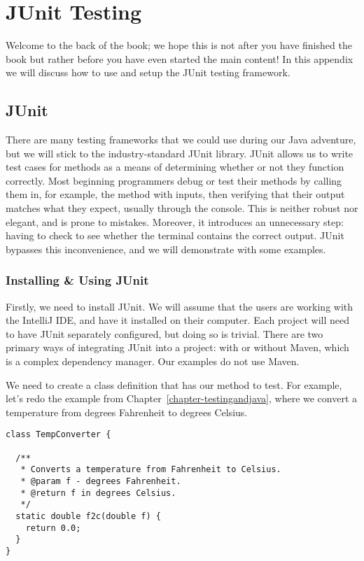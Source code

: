 \appendix
\chapter{JUnit Testing}
\label{appendix-junit} %

Welcome to the back of the book; we hope this is not after you have finished the book but rather before you have even started the main content! In this appendix we will discuss how to use and setup the JUnit testing framework.

\section{JUnit}

There are many testing frameworks that we could use during our Java adventure, but we will stick to the industry-standard JUnit library. JUnit allows us to write test cases for methods as a means of determining whether or not they function correctly. Most beginning programmers debug or test their methods by calling them in, for example, the  method with inputs, then verifying that their output matches what they expect, usually through the console. This is neither robust nor elegant, and is prone to mistakes. Moreover, it introduces an unnecessary step: having to check to see whether the terminal contains the correct output. JUnit bypasses this inconvenience, and we will demonstrate with some examples.

\subsection{Installing \& Using JUnit}

Firstly, we need to install JUnit. We will assume that the users are working with the IntelliJ IDE, and have it installed on their computer. Each project will need to have JUnit separately configured, but doing so is trivial. There are two primary ways of integrating JUnit into a project: with or without Maven, which is a complex dependency manager. Our examples do not use Maven.

We need to create a class definition that has our method to test. For example, let's redo the example from Chapter~\ref{chapter-testingandjava}, where we convert a temperature from degrees Fahrenheit to degrees Celsius.

\begin{lstlisting}[language=MyJava]
class TempConverter {

  /**
   * Converts a temperature from Fahrenheit to Celsius.
   * @param f - degrees Fahrenheit.
   * @return f in degrees Celsius.
   */
  static double f2c(double f) {
    return 0.0;
  }
}
\end{lstlisting}

